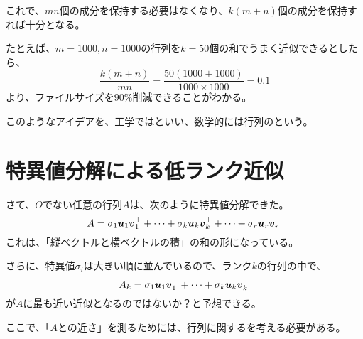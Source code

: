\documentclass[../../../topic_linear-algebra]{subfiles}
\begin{document}
\br

これで、$mn$個の成分を保持する必要はなくなり、$k(m+n)$個の成分を保持すれば十分となる。

\br

たとえば、$m=1000, n=1000$の行列を$k=50$個の和でうまく近似できるとしたら、
\begin{equation*}
  \frac{k(m+n)}{mn} = \frac{50(1000+1000)}{1000 \times 1000} = 0.1
\end{equation*}
より、ファイルサイズを$90\%$削減できることがわかる。

\br

このようなアイデアを、工学ではといい、数学的には行列のという。

\sectionline
\section{特異値分解による低ランク近似}

さて、$O$でない任意の行列$A$は、次のように特異値分解できた。
\begin{equation*}
  A = \sigma_1 \vb*{u}_1 \vb*{v}_1^\top + \cdots + \sigma_k \vb*{u}_k \vb*{v}_k^\top + \cdots + \sigma_r \vb*{u}_r \vb*{v}_r^\top
\end{equation*}
これは、「縦ベクトルと横ベクトルの積」の和の形になっている。

\br

さらに、特異値$\sigma_i$は大きい順に並んでいるので、ランク$k$の行列の中で、
\begin{equation*}
  A_k = \sigma_1 \vb*{u}_1 \vb*{v}_1^\top + \cdots + \sigma_k \vb*{u}_k \vb*{v}_k^\top
\end{equation*}
が$A$に最も近い近似となるのではないか？と予想できる。

\br

ここで、「$A$との近さ」を測るためには、行列に関するを考える必要がある。
\end{document}
